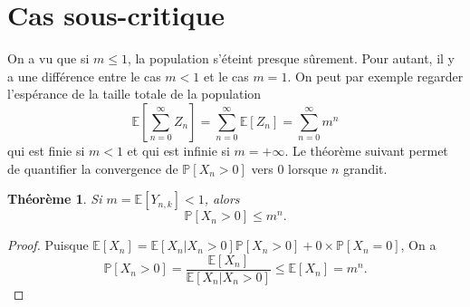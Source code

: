 \documentclass[a4paper,12pt]{book}
\newtheorem{thmfr}{Théorème}[section]
\begin{document}
\section{Cas sous-critique}
On a vu que si $m\leq 1$, la population s'éteint presque sûrement. Pour autant, il y a une différence entre le cas $m<1$ et le cas $m=1$. On peut par exemple regarder l'espérance de la taille totale de la population
$$\mathbb{E}\left[\sum_{n=0}^\infty Z_n\right]=\sum_{n=0}^\infty \mathbb{E}\left[Z_n\right] =\sum_{n=0}^\infty m^n $$
qui est finie si $m<1$ et qui est infinie si $m=+\infty$. Le théorème suivant permet de quantifier la convergence de $\mathbb{P}[X_n>0]$ vers $0$ lorsque $n$ grandit.
\begin{thmfr}
Si $m=\mathbb{E}[Y_{n,k}]<1$, alors
$$\mathbb{P}[X_n>0]\leq m^n.$$
\end{thmfr}
\begin{proof}
Puisque $\mathbb{E}[X_n]=\mathbb{E}[X_n|X_n>0]\mathbb{P}[X_n>0]+0\times \mathbb{P}[X_n=0]$,
On a
$$\mathbb{P}[X_n>0]=\frac{\mathbb{E}[X_n]}{\mathbb{E}[X_n|X_n>0]}\leq \mathbb{E}[X_n]=m^n.$$
\end{proof}
\end{document}
